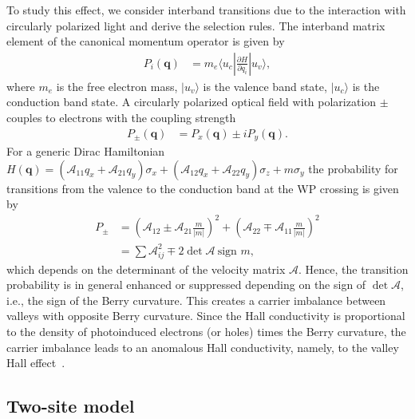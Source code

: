 \documentclass[aps,preprintnumbers,amsmath,amssymb]{revtex4-2}
\begin{document}
To study this effect, we consider interband transitions due to the interaction with circularly polarized light and derive the selection rules. The interband matrix element of the canonical momentum operator is given by
\begin{align}
    P_i(\mathbf{q}) &= m_e \langle u_c|\tfrac{\partial H}{\partial q_i}|u_v\rangle,\label{circ_pol_light}
\end{align}
where $m_e$ is the free electron mass, $|u_v\rangle$ is the valence band state, $|u_c\rangle$ is the conduction band state.
A circularly polarized optical field with polarization $\pm$ couples to electrons with the coupling strength 
\begin{align}
    P_{\pm}(\mathbf{q}) &= P_x(\mathbf{q}) \pm i P_y(\mathbf{q}).\label{circ_pol_light}
\end{align}
For a generic Dirac Hamiltonian $H(\mathbf{q}) = (\mathcal{A}_{11}q_x+\mathcal{A}_{21}q_y)\sigma_x+(\mathcal{A}_{12}q_x+\mathcal{A}_{22}q_y)\sigma_z+m\sigma_y$ the probability for transitions from the valence
to the conduction band at the WP crossing is given by
\begin{align}
    P_{\pm} &= (\mathcal{A}_{12}\pm \mathcal{A}_{21}\tfrac{m}{|m|})^2 + (\mathcal{A}_{22} \mp \mathcal{A}_{11}\tfrac{m}{|m|})^2 \\
    &= \sum \mathcal{A}_{ij}^2 \mp 2 \det \mathcal{A} \ \text{sign } m ,
\end{align}
which depends on the determinant of the velocity matrix
$\mathcal{A}$.
Hence, the transition probability is in general
enhanced or suppressed depending on the sign
of $\det \mathcal{A}$, i.e., the sign of the Berry curvature.
%
%
This creates a carrier imbalance between valleys
with opposite Berry curvature. 
Since the Hall conductivity is proportional to the density of photoinduced electrons (or holes) times 
the Berry curvature,
the carrier imbalance leads to 
an anomalous Hall conductivity, namely,
to the valley Hall effect~\cite{PhysRevB.77.235406}.

\subsection{Two-site model}\label{appendix_2sites}
\end{document}
